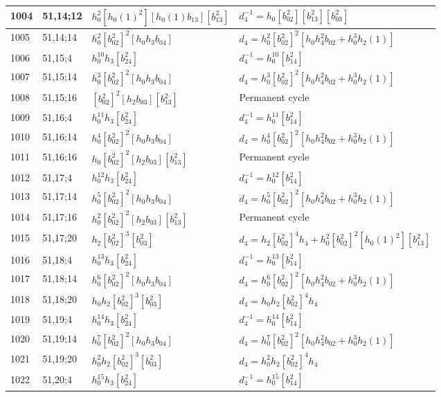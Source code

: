 \documentclass{article}
\begin{document}
\begin{longtable}{|l|l|>{\raggedright\arraybackslash}p{6cm}|>{\raggedright\arraybackslash}p{6cm}|}
\hline
1004 & 51,14;12 & $h_0^2[h_0(1)^2][h_0(1)b_{13}][b_{13}^2]$ & $d_{4}^{-1}=h_0[b_{02}^2][b_{13}^2][b_{03}^2]$\\
\hline
1005 & 51,14;14 & $h_0^2[b_{02}^2]^2[h_0h_3b_{04}]$ &$d_{4}=h_0^2[b_{02}^2]^2[h_0h_4^2b_{02} + h_0^3h_2(1)]$\\
\hline
1006 & 51,15;4 & $h_0^{10}h_3[b_{24}^2]$ & $d_{4}^{-1}=h_0^{10}[b_{14}^2]$\\
\hline
1007 & 51,15;14 & $h_0^3[b_{02}^2]^2[h_0h_3b_{04}]$ &$d_{4}=h_0^3[b_{02}^2]^2[h_0h_4^2b_{02} + h_0^3h_2(1)]$\\
\hline
1008 & 51,15;16 & $[b_{02}^2]^2[h_2b_{03}][b_{13}^2]$ & Permanent cycle\\
\hline
1009 & 51,16;4 & $h_0^{11}h_3[b_{24}^2]$ & $d_{4}^{-1}=h_0^{11}[b_{14}^2]$\\
\hline
1010 & 51,16;14 & $h_0^4[b_{02}^2]^2[h_0h_3b_{04}]$ &$d_{4}=h_0^4[b_{02}^2]^2[h_0h_4^2b_{02} + h_0^3h_2(1)]$\\
\hline
1011 & 51,16;16 & $h_0[b_{02}^2]^2[h_2b_{03}][b_{13}^2]$ & Permanent cycle\\
\hline
1012 & 51,17;4 & $h_0^{12}h_3[b_{24}^2]$ & $d_{4}^{-1}=h_0^{12}[b_{14}^2]$\\
\hline
1013 & 51,17;14 & $h_0^5[b_{02}^2]^2[h_0h_3b_{04}]$ &$d_{4}=h_0^5[b_{02}^2]^2[h_0h_4^2b_{02} + h_0^3h_2(1)]$\\
\hline
1014 & 51,17;16 & $h_0^2[b_{02}^2]^2[h_2b_{03}][b_{13}^2]$ & Permanent cycle\\
\hline
1015 & 51,17;20 & $h_2[b_{02}^2]^3[b_{03}^2]$ &$d_{4}=h_2[b_{02}^2]^4h_4 + h_0^2[b_{02}^2]^2[h_0(1)^2][b_{13}^2]$\\
\hline
1016 & 51,18;4 & $h_0^{13}h_3[b_{24}^2]$ & $d_{4}^{-1}=h_0^{13}[b_{14}^2]$\\
\hline
1017 & 51,18;14 & $h_0^6[b_{02}^2]^2[h_0h_3b_{04}]$ &$d_{4}=h_0^6[b_{02}^2]^2[h_0h_4^2b_{02} + h_0^3h_2(1)]$\\
\hline
1018 & 51,18;20 & $h_0h_2[b_{02}^2]^3[b_{03}^2]$ &$d_{4}=h_0h_2[b_{02}^2]^4h_4$\\
\hline
1019 & 51,19;4 & $h_0^{14}h_3[b_{24}^2]$ & $d_{4}^{-1}=h_0^{14}[b_{14}^2]$\\
\hline
1020 & 51,19;14 & $h_0^7[b_{02}^2]^2[h_0h_3b_{04}]$ &$d_{4}=h_0^7[b_{02}^2]^2[h_0h_4^2b_{02} + h_0^3h_2(1)]$\\
\hline
1021 & 51,19;20 & $h_0^2h_2[b_{02}^2]^3[b_{03}^2]$ &$d_{4}=h_0^2h_2[b_{02}^2]^4h_4$\\
\hline
1022 & 51,20;4 & $h_0^{15}h_3[b_{24}^2]$ & $d_{4}^{-1}=h_0^{15}[b_{14}^2]$\\

\end{longtable}
\end{document}
